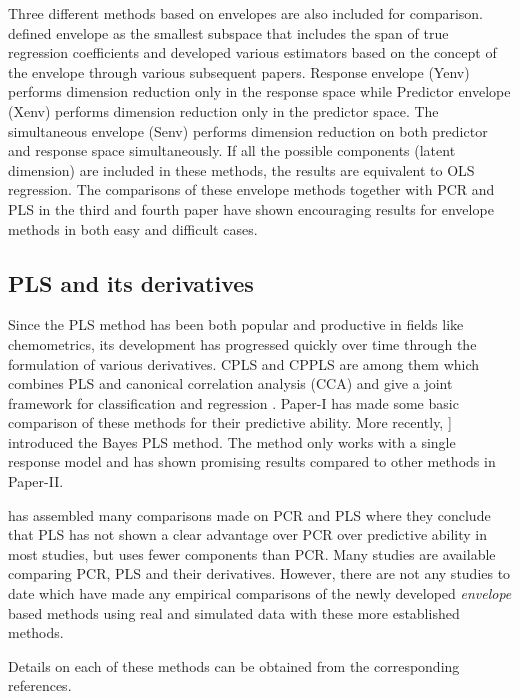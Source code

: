 \documentclass[11pt,twoside,openright,titlepage,
  headinclude,footinclude,BCOR=5mm,
  numbers=noenddot,cleardoublepage=empty,
  tablecaptionabove, dottedtoc,
  bibliography=totoc,paper=a4]{scrreprt}
\begin{document}
Three different methods based on envelopes are also included for comparison. \citet{Cook2007a} defined envelope as the smallest subspace that includes the span of true regression coefficients and developed various estimators based on the concept of the envelope through various subsequent papers. Response envelope (Yenv) \citep{cook2010envelope} performs dimension reduction only in the response space while Predictor envelope (Xenv) \citep{cook2013envelopes} performs dimension reduction only in the predictor space. The simultaneous envelope (Senv) \citep{cook2015simultaneous} performs dimension reduction on both predictor and response space simultaneously. If all the possible components (latent dimension) are included in these methods, the results are equivalent to OLS regression. The comparisons of these envelope methods together with PCR and PLS in the third and fourth paper have shown encouraging results for envelope methods in both easy and difficult cases.

\hypertarget{pls-and-its-derivatives}{%
\subsection{PLS and its derivatives}\label{pls-and-its-derivatives}}

Since the PLS method has been both popular and productive in fields like chemometrics, its development has progressed quickly over time through the formulation of various derivatives. CPLS and CPPLS are among them which combines PLS and canonical correlation analysis (CCA) and give a joint framework for classification and regression \citep{indahl2009canonical}. Paper-I has made some basic comparison of these methods for their predictive ability. More recently, \citet{helland2012near}{]} introduced the Bayes PLS method. The method only works with a single response model and has shown promising results compared to other methods in Paper-II.

\citet{WENTZELL2003257} has assembled many comparisons made on PCR and PLS where they conclude that PLS has not shown a clear advantage over PCR over predictive ability in most studies, but uses fewer components than PCR. Many studies are available comparing PCR, PLS and their derivatives. However, there are not any studies to date which have made any empirical comparisons of the newly developed \emph{envelope} based methods using real and simulated data with these more established methods.

Details on each of these methods can be obtained from the corresponding references.
\end{document}
